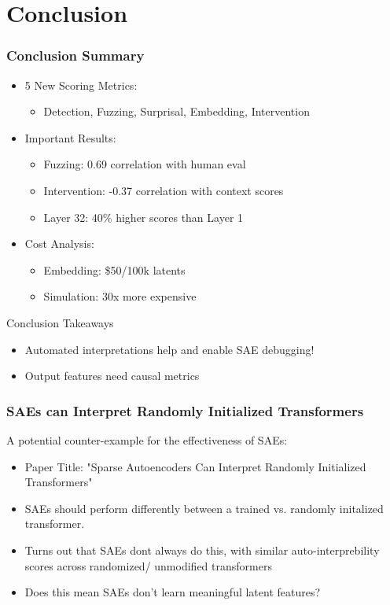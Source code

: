 \documentclass{beamer}
\begin{document}
\section{Conclusion}
\begin{frame}
\frametitle{Conclusion Summary}
\begin{itemize}
    \item 5 New Scoring Metrics:
    \begin{itemize}
        \item Detection, Fuzzing, Surprisal, Embedding, Intervention
    \end{itemize}
    
    \item Important Results:
    \begin{itemize}
        \item Fuzzing: 0.69 correlation with human eval
        \item Intervention: -0.37 correlation with context scores
        \item Layer 32: 40\% higher scores than Layer 1
    \end{itemize}
    
    \item Cost Analysis:
    \begin{itemize}
        \item Embedding: \$50/100k latents
        \item Simulation: 30x more expensive
    \end{itemize}
\end{itemize}

\begin{alertblock}
{Conclusion Takeaways}
\begin{itemize}
    \item Automated interpretations help and enable SAE debugging!
    \item Output features need causal metrics
\end{itemize}
\end{alertblock}
\end{frame}


\begin{frame}
\frametitle{SAEs can Interpret Randomly Initialized Transformers}
A potential counter-example for the effectiveness of SAEs:
\begin{itemize}
    \item Paper Title: "Sparse Autoencoders Can Interpret Randomly Initialized Transformers" \cite{heap2025sparseautoencodersinterpretrandomly}
    \item SAEs should perform differently between a trained vs. randomly initalized transformer.
    \item Turns out that SAEs dont always do this, with similar auto-interprebility scores across randomized/ unmodified transformers
    \item Does this mean SAEs don't learn meaningful latent features?
\end{itemize}
    
\end{frame}
\end{document}
